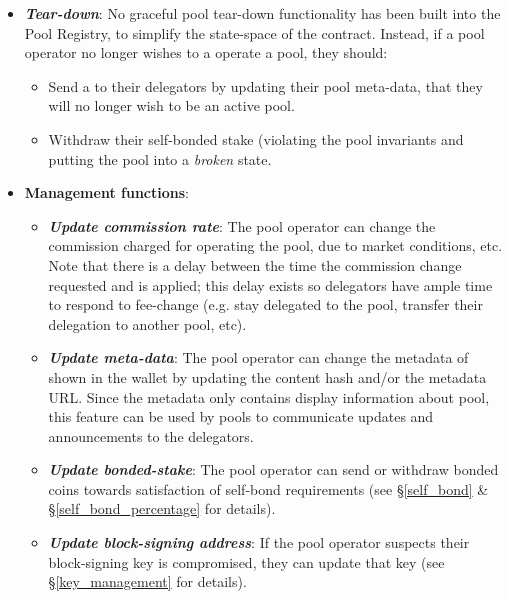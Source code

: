 \begin{itemize}
    \item \textbf{\textit{Tear-down}}: No graceful pool tear-down functionality has been built into the Pool Registry, to simplify the state-space of the contract. Instead, if a pool operator no longer wishes to a operate a pool, they should: 
    \begin{itemize}[label=--,nosep]
        \item Send a  to their delegators by updating their pool meta-data, that they will no longer wish to be an active pool. 
        \item Withdraw their self-bonded stake (violating the pool invariants and putting the pool into a \textit{broken} state. 
    \end{itemize}
    \item \textbf{Management functions}:
    \begin{itemize}
        \item \textbf{\textit{Update commission rate}}: The pool operator can change the commission charged for operating the pool, due to market conditions, etc. Note that there is a delay between the time the commission change requested and is applied; this delay exists so delegators have ample time to respond to fee-change (e.g. stay delegated to the pool, transfer their delegation to another pool, etc).
        \item \textbf{\textit{Update meta-data}}: The pool operator can change the metadata of shown in the wallet by updating the content hash and/or the metadata URL. Since the metadata only contains display information about pool, this feature can be used by pools to communicate updates and announcements to the delegators. 
        \item \textbf{\textit{Update bonded-stake}}: The pool operator can send or withdraw bonded coins towards satisfaction of self-bond requirements (see \S\ref{self_bond} \& \S\ref{self_bond_percentage} for details). 
        \item \textbf{\textit{Update block-signing address}}: If the pool operator suspects their block-signing key is compromised, they can update that  key (see \S\ref{key_management} for details). 
    \end{itemize}
\end{itemize}


